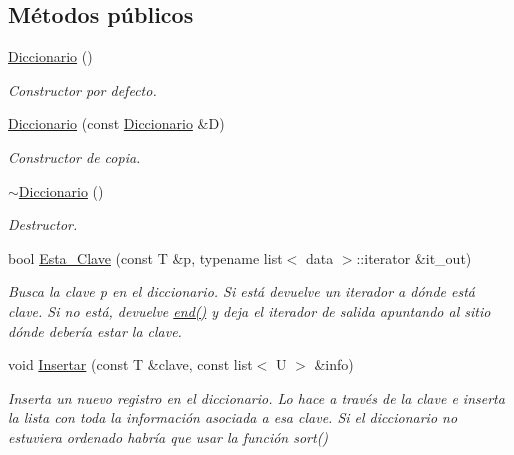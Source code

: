 \subsection*{Métodos públicos}
\begin{DoxyCompactItemize}
\item 
\mbox{\label{classDiccionario_adad32f7bfd34b7a8631ff5f26033b369}} 
\hyperlink{classDiccionario_adad32f7bfd34b7a8631ff5f26033b369}{Diccionario} ()
\begin{DoxyCompactList}\small\item\em Constructor por defecto. \end{DoxyCompactList}\item 
\hyperlink{classDiccionario_ad8917f4e401b473139403dc5964e8307}{Diccionario} (const \hyperlink{classDiccionario}{Diccionario} \&D)
\begin{DoxyCompactList}\small\item\em Constructor de copia. \end{DoxyCompactList}\item 
\mbox{\label{classDiccionario_a006b21559ae7e1b449c785fc47dfb04d}} 
\hyperlink{classDiccionario_a006b21559ae7e1b449c785fc47dfb04d}{$\sim$\+Diccionario} ()
\begin{DoxyCompactList}\small\item\em Destructor. \end{DoxyCompactList}\item 
bool \hyperlink{classDiccionario_a15dbc0f951542ce3e75a35ee38cc9388}{Esta\+\_\+\+Clave} (const T \&p, typename list$<$ data $>$\+::iterator \&it\+\_\+out)
\begin{DoxyCompactList}\small\item\em Busca la clave p en el diccionario. Si está devuelve un iterador a dónde está clave. Si no está, devuelve \hyperlink{classDiccionario_aa6f9f59a1f6478b7ff61369132fb4061}{end()} y deja el iterador de salida apuntando al sitio dónde debería estar la clave. \end{DoxyCompactList}\item 
void \hyperlink{classDiccionario_af520b73907852cc8002260ddf9fb822c}{Insertar} (const T \&clave, const list$<$ U $>$ \&info)
\begin{DoxyCompactList}\small\item\em Inserta un nuevo registro en el diccionario. Lo hace a través de la clave e inserta la lista con toda la información asociada a esa clave. Si el diccionario no estuviera ordenado habría que usar la función sort() \end{DoxyCompactList}\item 

\end{DoxyCompactItemize}
